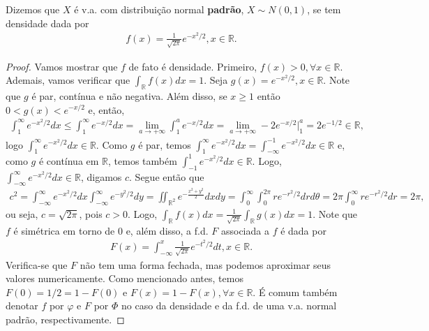 \documentclass[../Notas.tex]{subfiles}
\begin{document}
\begin{example}
Dizemos que $X$ é v.a. com distribuição normal \textbf{padrão}, $X\sim N(0,1)$, se tem densidade dada por
\begin{align*}
    f(x) = \frac{1}{\sqrt{2\pi}}e^{-x^2/2}, x\in\mathbb{R}.
\end{align*}
\begin{proof}
Vamos mostrar que $f$ de fato é densidade. Primeiro, $f(x) > 0, \forall x\in\mathbb{R}$. Ademais, vamos verificar que $\displaystyle{ \int_{\mathbb{R}} f(x) dx = 1 }$. Seja $g(x) = e^{-x^2/2}, x\in\mathbb{R}$. Note que $g$ é par, contínua e não negativa. Além disso, se $x\geq 1$ então $0 < g(x) < e^{-x/2}$ e, então,
\begin{align*}
    \int_{1}^{\infty} e^{-x^2/2} dx \leq \int_{1}^{\infty} e^{-x/2} dx = \lim_{a\to +\infty} \int_{1}^{a} e^{-x/2} dx = \lim_{a\to +\infty} -2e^{-x/2}\Big|_{1}^a = 2e^{-1/2}\in\mathbb{R},
\end{align*}
logo $\displaystyle{ \int_{1}^{\infty} e^{-x^2/2} dx \in\mathbb{R}}$. Como $g$ é par, temos $\displaystyle{ \int_{1}^{\infty} e^{-x^2/2} dx = \int_{-\infty}^{-1} e^{-x^2/2} dx \in\mathbb{R}}$ e, como $g$ é contínua em $\mathbb{R}$, temos também $\displaystyle{ \int_{-1}^{1} e^{-x^2/2} dx \in\mathbb{R}}$. Logo, $\displaystyle{ \int_{-\infty}^{\infty} e^{-x^2/2} dx \in\mathbb{R}}$, digamos $c$. Segue então que
\begin{align*}
    c^2 = \int_{-\infty}^{\infty} e^{-x^2/2} dx\int_{-\infty}^{\infty} e^{-y^2/2} dy = \iint_{\mathbb{R}^2} e^{-\frac{x^2+y^2}{2}} dxdy = \int_{0}^{\infty}\int_{0}^{2\pi} re^{-r^2/2} drd\theta = 2\pi \int_{0}^{\infty} re^{-r^2/2} dr = 2\pi,
\end{align*}
ou seja, $c = \sqrt{2\pi}$, pois $c>0$. Logo, $\displaystyle{ \int_{\mathbb{R}} f(x) dx = \frac{1}{\sqrt{2\pi}} \int_{\mathbb{R}} g(x) dx = 1.}$ Note que $f$ é simétrica em torno de 0 e, além disso, a f.d. $F$ associada a $f$ é dada por
\begin{align*}
    F(x) = \int_{-\infty}^x \frac{1}{\sqrt{2\pi}} e^{-t^2/2} dt, x\in\mathbb{R}.
\end{align*}
Verifica-se que $F$ não tem uma forma fechada, mas podemos aproximar seus valores numericamente. Como mencionado antes, temos $F(0) = 1/2 = 1 - F(0)$ e $F(x) = 1 - F(x), \forall x\in\mathbb{R}$. É comum também denotar $f$ por $\varphi$ e $F$ por $\Phi$ no caso da densidade e da f.d. de uma v.a. normal padrão, respectivamente.
\end{proof}
\begin{remark}

\end{remark}
\end{example}
\end{document}

